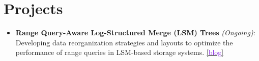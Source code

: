 \documentclass[10pt,a4paper,calibri]{moderncv}
\begin{document}
\section{Projects}

\begin{itemize}\setlength\itemsep{0.4em}
	\item \textbf{Range Query-Aware Log-Structured Merge (LSM) Trees} \textit{(Ongoing)}: Developing data reorganization strategies and layouts to optimize the performance of range queries in LSM-based storage systems.
	      \href{https://github.com/shubham-sudo/LSMQueryDrivenCompaction}{[\textcolor{blueviolet}{blog}]}



\end{itemize}
\end{document}
